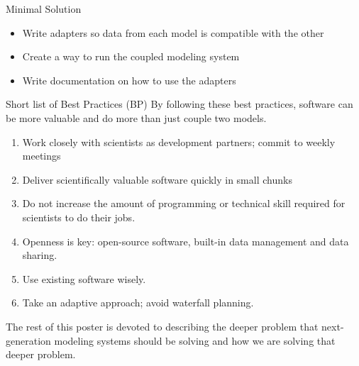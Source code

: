 \documentclass[final]{beamer}
\newlength{\onecolwid}
\begin{document}
\begin{frame}[t]
\begin{columns}[t]
\begin{column}{\onecolwid}
\begin{block}{Minimal Solution}
    \begin{itemize}
        \item Write adapters so data from each model is compatible with the other
        \item Create a way to run the coupled modeling system
        \item Write documentation on how to use the adapters
    \end{itemize}
\end{block}

\begin{block}{Short list of Best Practices (BP)}
    By following these best practices, software can be more valuable and do more than just
    couple two models.
    \begin{enumerate}
        \item{Work closely with scientists as development partners; commit to weekly meetings}
        \item{Deliver scientifically valuable software quickly in small chunks}
        \item{Do not increase the amount of programming or technical skill required for scientists to do their jobs.}
        \item{Openness is key: open-source software, built-in data management and data sharing.}
        \item{Use existing software wisely.}
        \item{Take an adaptive approach; avoid waterfall planning.}
    \end{enumerate}
    The rest of this poster is devoted to describing the deeper problem that
    next-generation modeling systems should be solving and how we are solving that deeper problem.
\end{block}




\end{column}
\end{columns}
\end{frame}
\end{document}
